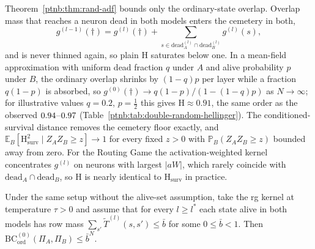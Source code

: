 \begin{remark}\label{ptnb:rem:adf-cemetery-floor}
Theorem~\ref{ptnb:thm:rand-adf} bounds only the ordinary-state overlap.  Overlap mass that reaches a
neuron dead in both models enters the cemetery in both,
\[
g^{(l-1)}(\dagger) = g^{(l)}(\dagger) +
    \sum_{s \in \mathrm{dead}^{(l)}_A \cap \mathrm{dead}^{(l)}_B} g^{(l)}(s),
\]
and is never thinned
again, so plain $\mathrm{H}$ saturates below one.  In a mean-field approximation with uniform dead
fraction $q$ under $A$ and alive probability $p$ under $B$, the ordinary overlap shrinks by
$(1-q)p$ per layer while a fraction $q(1-p)$ is absorbed, so $g^{(0)}(\dagger) \to
    q(1-p)/(1-(1-q)p)$ as $N \to \infty$; for illustrative values $q = 0.2$, $p = \tfrac{1}{2}$ this
gives $\mathrm{H} \approx 0.91$, the same order as the observed $0.94$--$0.97$
(Table~\ref{ptnb:tab:double-random-hellinger}).  The conditioned-survival distance removes the cemetery
floor exactly, and $\mathbb{E}_B[\mathrm{H}^2_{\mathrm{surv}} \mid Z_A Z_B \geq z] \allowbreak\to 1$ for every
fixed $z > 0$ with $\mathbb{P}_B(Z_A Z_B \geq z)$ bounded away from zero.  For the Routing Game the
activation-weighted kernel concentrates $g^{(l)}$ on neurons with largest $|a W|$, which rarely
coincide with $\mathrm{dead}_A \cap \mathrm{dead}_B$, so $\mathrm{H}$ is nearly identical to
$\mathrm{H}_{\mathrm{surv}}$ in practice.
\end{remark}

\begin{theoremenv}\label{ptnb:thm:rand-routing}\label{thm:rand_routing}
Under the same setup without the alive-set assumption, take the \ac{rg} kernel at temperature $\tau
    > 0$ and assume that for every $l \geq l^*$ each state alive in both models has row mass
$\sum_{s'}\widetilde{T}^{(l)}(s, s') \leq \bar{b}$ for some $0 \leq \bar{b} < 1$.  Then
$\mathrm{BC}^{(0)}_{\mathrm{ord}}(\Pi_A, \Pi_B) \leq \bar{b}^{N}$.\end{theoremenv}

